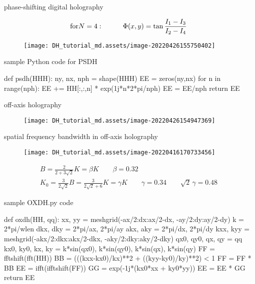 \documentclass[t, aspectratio=169]{beamer}
\begin{document}
\begin{frame}{phase-shifting digital holography}

	\[ \textrm{for} N=4:\hspace{10 mm} \Phi(x,y) = \tan\frac{I_1 - I_3}{I_2 - I_4} \]
	
	\begin{figure}
		\texttt{[image: DH\_tutorial\_md.assets/image-20220426155750402]}
	\end{figure}
	
\end{frame}


\begin{frame}[fragile]{sample Python code for PSDH}
\begin{semiverbatim}
def psdh(HHH):
	ny, nx, nph = shape(HHH)
	EE = zeros(ny,nx)
	for n in range(nph):
		EE += HH[:,:,n] * exp(1j*n*2*pi/nph)
    EE = EE/nph
    return EE
\end{semiverbatim}
\end{frame}


\begin{frame}{off-axis holography}
	\begin{figure}
		\texttt{[image: DH\_tutorial\_md.assets/image-20220426154947369]}
	\end{figure}
\end{frame}


\begin{frame}{spatial frequency bandwidth in off-axis holography}
	\begin{figure}
		\texttt{[image: DH\_tutorial\_md.assets/image-20220416170733456]}
	\end{figure}
	\begin{gather*}
B = \frac{2}{2+3\sqrt{2}}K = \beta K \qquad \beta=0.32 \\
K_0 = \frac{3}{2\sqrt{2}}B = \frac{3}{2\sqrt{2}+6} K = \gamma K \qquad \gamma=0.34 \qquad \sqrt{2}\,\gamma = 0.48 
	\end{gather*}
\end{frame}


\begin{frame}[fragile]{sample OXDH.py code}
\begin{semiverbatim}
def oxdh(HH, qq):
    xx, yy = meshgrid(-ax/2:dx:ax/2-dx, -ay/2:dy:ay/2-dy)
    k = 2*pi/wlen
    dkx, dky = 2*pi/ax, 2*pi/ay
    akx, aky = 2*pi/dx, 2*pi/dy
    kxx, kyy = meshgrid(-akx/2:dkx:akx/2-dkx, -aky/2:dky:aky/2-dky)
    qx0, qy0, qx, qy = qq	%
    kx0, ky0, kx, ky = k*sin(qx0), k*sin(qy0), k*sin(qx), k*sin(qy)   
    FF = fftshift(fft(HH))    
    BB = (((kxx-kx0)/kx)**2 + ((kyy-ky0)/ky)**2) < 1
    FF = FF * BB
    EE = ifft(ifftshift(FF)) 
    GG = exp(-1j*(kx0*xx + ky0*yy))
    EE = EE * GG    
    return EE
\end{semiverbatim}
\end{frame}
\end{document}
